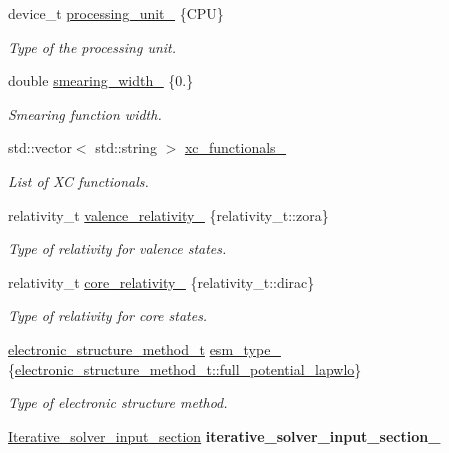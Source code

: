 \begin{DoxyCompactItemize}
\item 
device\+\_\+t \hyperlink{classsirius_1_1_simulation__parameters_a792a45ca1ec748a434b36754277a64b9}{processing\+\_\+unit\+\_\+} \{C\+P\+U\}
\begin{DoxyCompactList}\small\item\em Type of the processing unit. \end{DoxyCompactList}\item 
double \hyperlink{classsirius_1_1_simulation__parameters_aafdd05760d3a3087f077bbebf263161f}{smearing\+\_\+width\+\_\+} \{0.\}
\begin{DoxyCompactList}\small\item\em Smearing function width. \end{DoxyCompactList}\item 
std\+::vector$<$ std\+::string $>$ \hyperlink{classsirius_1_1_simulation__parameters_ab01a2e1c36f1d9ccd0e0d5baf62e689d}{xc\+\_\+functionals\+\_\+}
\begin{DoxyCompactList}\small\item\em List of X\+C functionals. \end{DoxyCompactList}\item 
relativity\+\_\+t \hyperlink{classsirius_1_1_simulation__parameters_a7cd6b301b7ab72a9c9ca7193eb018fc9}{valence\+\_\+relativity\+\_\+} \{relativity\+\_\+t\+::zora\}
\begin{DoxyCompactList}\small\item\em Type of relativity for valence states. \end{DoxyCompactList}\item 
relativity\+\_\+t \hyperlink{classsirius_1_1_simulation__parameters_ab54050138f051531ef2be6db38b41d66}{core\+\_\+relativity\+\_\+} \{relativity\+\_\+t\+::dirac\}
\begin{DoxyCompactList}\small\item\em Type of relativity for core states. \end{DoxyCompactList}\item 
\hyperlink{typedefs_8h_ad0240253ab18ec5b88c5e78866b1128a}{electronic\+\_\+structure\+\_\+method\+\_\+t} \hyperlink{classsirius_1_1_simulation__parameters_a5f94855bdb699dad9f51ec2b5549d127}{esm\+\_\+type\+\_\+} \{\hyperlink{typedefs_8h_ad0240253ab18ec5b88c5e78866b1128aa5631a967093ee076a9e178b503774887}{electronic\+\_\+structure\+\_\+method\+\_\+t\+::full\+\_\+potential\+\_\+lapwlo}\}
\begin{DoxyCompactList}\small\item\em Type of electronic structure method. \end{DoxyCompactList}\item 
\hypertarget{classsirius_1_1_simulation__parameters_a45d0cc1b4cf119f3bb73e60219b1bd41}{}\hyperlink{structsirius_1_1_iterative__solver__input__section}{Iterative\+\_\+solver\+\_\+input\+\_\+section} {\bfseries iterative\+\_\+solver\+\_\+input\+\_\+section\+\_\+}\label{classsirius_1_1_simulation__parameters_a45d0cc1b4cf119f3bb73e60219b1bd41}


\end{DoxyCompactItemize}
